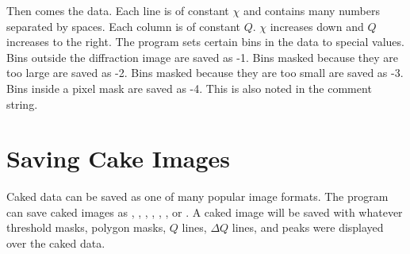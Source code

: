 Then comes the data. Each line is of constant 
$\chi$ and contains many numbers separated by
spaces. Each column is of constant $Q$. $\chi$ increases down and 
$Q$ increases to the right. The program sets certain bins in 
the data to special values. Bins outside the diffraction
image are saved as -1. Bins masked because they are too 
large are saved as -2. Bins masked because they are too 
small are saved as -3. Bins inside a pixel mask are saved 
as -4. This is also noted in the comment string. 

\section{Saving Cake Images}

Caked data can be saved as one of many popular image formats.
The program can save caked images as , , , 
, , , or .  A caked image
will be saved with whatever threshold masks, polygon masks, $Q$ lines, 
$\Delta Q$ lines, and peaks were displayed over the caked data. 


